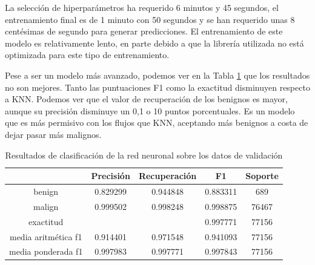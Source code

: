 La selección de hiperparámetros ha requerido 6 minutos y 45 segundos, el entrenamiento final es de 1 minuto con 50 segundos y se han requerido unas 8 centésimas de segundo para generar predicciones. El entrenamiento de este modelo es relativamente lento, en parte debido a que la librería utilizada no está optimizada para este tipo de entrenamiento.

Pese a ser un modelo más avanzado, podemos ver en la Tabla \ref{table:nnresults} que los resultados no son mejores. Tanto las puntuaciones F1 como la exactitud disminuyen respecto a KNN. Podemos ver que el valor de recuperación de los benignos es mayor, aunque su precisión disminuye un 0,1 o 10 puntos porcentuales. Es un modelo que es más permisivo con los flujos que KNN, aceptando más benignos a costa de dejar pasar más malignos.

\begin{table}[H]
    \begin{center}
        \begin{tabular}{|c | c c c | c |} 
            \hline
            & \textbf{Precisión} & \textbf{Recuperación} & \textbf{F1}  & \textbf{Soporte} \\
            \hline
            benign               & 0.829299 & 0.944848 & 0.883311  &   689 \\
            malign               & 0.999502 & 0.998248 & 0.998875  & 76467 \\
            \hline
            exactitud            &          &          & 0.997771  & 77156 \\
            media aritmética f1  & 0.914401 & 0.971548 & 0.941093  & 77156 \\
            media ponderada f1   & 0.997983 & 0.997771 & 0.997843  & 77156 \\
            \hline
        \end{tabular}
    \end{center}
    \caption{Resultados de clasificación de la red neuronal sobre los datos de validación}
    \label{table:nnresults}
\end{table}

